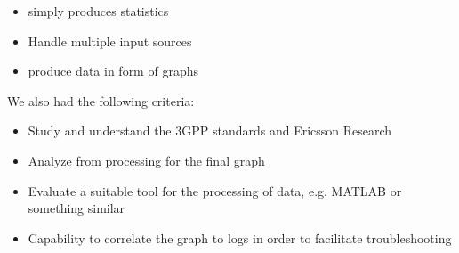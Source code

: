 \documentclass[cropmarks, frame, english]{idamasterthesis}
\begin{document}
 \begin{itemize} 
 \item simply produces statistics
 \item Handle multiple input sources
 \item produce data in form of graphs
 \end{itemize} 

\setlength{\parindent}{0cm} We also had the following criteria: 
 
 \begin{itemize} 
 \item Study and understand the 3GPP standards and Ericsson Research
 \item Analyze from processing for the final graph
 \item Evaluate a suitable tool for the processing of data, e.g. MATLAB or something similar
 \item Capability to correlate the graph to logs in order to facilitate troubleshooting
 \end{itemize}
\end{document}
